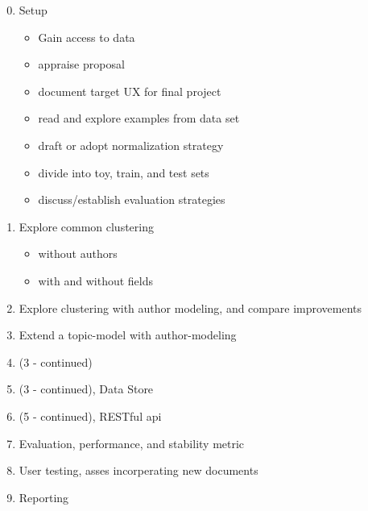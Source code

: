 \documentclass{article}
\begin{document}
\begin{multicols}{2}
\begin{enumerate}[\texttt{WK} 1 -]
  \setcounter{enumi}{-1}
\item Setup
  \begin{itemize}
  \item Gain access to data
  \item appraise proposal
  \item document target UX for final project
  \item read and explore examples from data set
  \item draft or adopt normalization strategy
  \item divide into toy, train, and test sets
  \item discuss/establish evaluation strategies
  \end{itemize}
\item Explore common clustering
  \begin{itemize}
  \item without authors
  \item with and without fields
  \end{itemize}
\item Explore clustering with author modeling, and compare improvements
\item Extend a topic-model with author-modeling
\item (3 - continued)
\item (3 - continued), Data Store
\item (5 - continued), RESTful api
\item Evaluation, performance, and stability metric
\item User testing, asses incorperating new documents
\item Reporting
\end{enumerate}


\begin{comment}


\end{comment}
\end{multicols}
\end{document}
